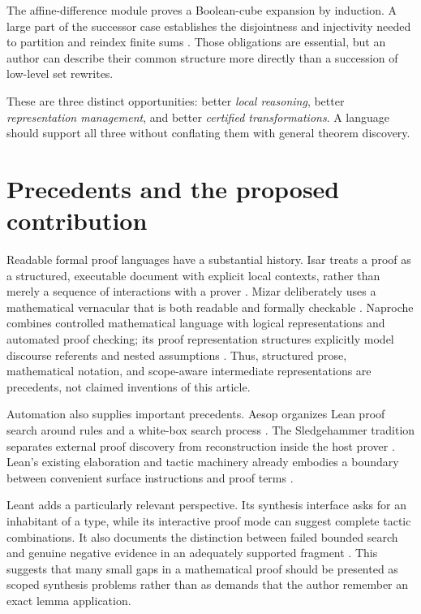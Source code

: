 \documentclass[11pt,letterpaper]{article}
\theoremstyle{remark}
\begin{document}
The affine-difference module proves a Boolean-cube expansion by induction. A large part of the successor case establishes the disjointness and injectivity needed to partition and reindex finite sums \cite{proveit-affine}. Those obligations are essential, but an author can describe their common structure more directly than a succession of low-level set rewrites.

These are three distinct opportunities: better \emph{local reasoning}, better \emph{representation management}, and better \emph{certified transformations}. A language should support all three without conflating them with general theorem discovery.

\section{Precedents and the proposed contribution}
\label{sec:related}

Readable formal proof languages have a substantial history. Isar treats a proof as a structured, executable document with explicit local contexts, rather than merely a sequence of interactions with a prover \cite{isar}. Mizar deliberately uses a mathematical vernacular that is both readable and formally checkable \cite{mizar}. Naproche combines controlled mathematical language with logical representations and automated proof checking; its proof representation structures explicitly model discourse referents and nested assumptions \cite{naproche,naproche-paper}. Thus, structured prose, mathematical notation, and scope-aware intermediate representations are precedents, not claimed inventions of this article.

Automation also supplies important precedents. Aesop organizes Lean proof search around rules and a white-box search process \cite{aesop}. The Sledgehammer tradition separates external proof discovery from reconstruction inside the host prover \cite{sledgehammer}. Lean's existing elaboration and tactic machinery already embodies a boundary between convenient surface instructions and proof terms \cite{lean-elaboration,lean-tactics}.

Leant adds a particularly relevant perspective. Its synthesis interface asks for an inhabitant of a type, while its interactive proof mode can suggest complete tactic combinations. It also documents the distinction between failed bounded search and genuine negative evidence in an adequately supported fragment \cite{leant-readme}. This suggests that many small gaps in a mathematical proof should be presented as scoped synthesis problems rather than as demands that the author remember an exact lemma application.
\end{document}
